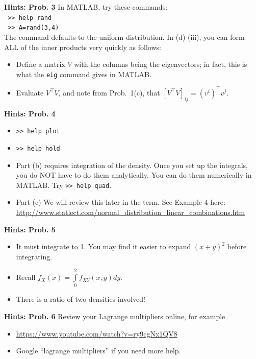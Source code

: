 \documentclass[letterpaper]{article}
\begin{document}
\noindent \textbf{Hints: Prob. 3} In MATLAB, try these commands: \\
\texttt{ >> help rand} \\
\texttt{ >> A=rand(3,4)}\\
The command defaults to the uniform distribution. In (d)-(iii), you can form ALL of the inner products very quickly as follows:
\begin{itemize}
\item  Define a matrix $V$ with the columns being the eigenvectors; in fact, this is what the \texttt{eig} command gives in MATLAB.
    \item Evaluate $V^\top V$, and note from Prob.~1(c), that $[V^\top V]_{ij} = (v^i)^\top v^j$.
\end{itemize}

\vspace{1cm}

\noindent \textbf{Hints: Prob. 4}
\begin{itemize}
\item \texttt{>> help plot}
\item \texttt{>> help hold}
\item Part (b) requires integration of the density. Once you set up the integrals, you do NOT have to do them analytically. You can do them numerically in MATLAB. Try \texttt{>> help quad}.
    \item Part (c) We will review this later in the term. See Example 4 here:\\
    \url{http://www.statlect.com/normal_distribution_linear_combinations.htm}
\end{itemize}

\newpage

\noindent \textbf{Hints: Prob. 5}
\begin{itemize}
\item It must integrate to 1. You may find it easier to expand $(x+y)^2$ before integrating.
\item Recall $f_{X}(x) = \int \limits_{0}^{2} f_{XY}(x,y) dy $.
\item There is a ratio of two densities involved!
\end{itemize}

\vspace{1cm}


\noindent \textbf{Hints: Prob. 6} Review your Lagrange multipliers online, for example
\begin{itemize}
\item \url{https://www.youtube.com/watch?v=ry9cgNx1QV8}
\item Google ``lagrange multipliers'' if you need more help.
\end{itemize}
\end{document}
